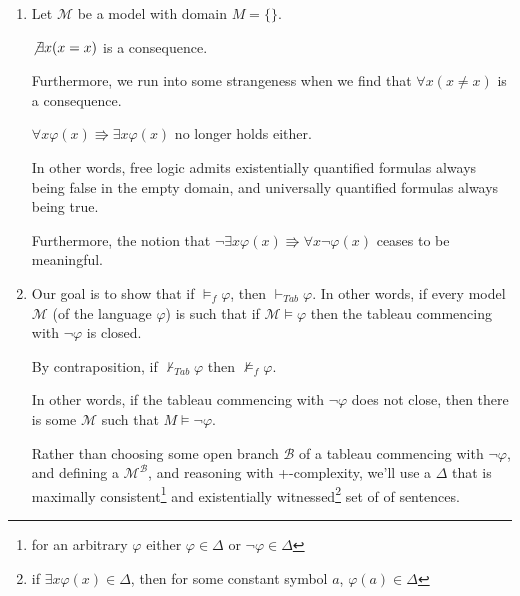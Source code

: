 \documentclass[a4paper]{article}
\newcommand{\MODEL}{\mathcal{M}}
\newcommand{\SET}[1]{\{ {#1} \}}
\begin{document}
\begin{enumerate}
    \item 

Let $\MODEL$ be a model with domain $M = \SET{}$. 


    $\not\exists x(x = x)$ is a consequence.

    Furthermore, we run into some strangeness when we find that $\forall x (x \neq x)$ is a consequence.

    $\forall x \varphi(x) \Rrightarrow \exists x \varphi(x)$ no longer holds either.

    In other words, free logic admits existentially quantified formulas always being false in the empty domain, and universally quantified formulas always being true.
    
    Furthermore, the notion that $\neg \exists x \varphi(x) \Rrightarrow \forall x \neg \varphi (x)$ ceases to be meaningful.


    \item  

Our goal is to show that if $\models_{f} \varphi$, then $\vdash_{Tab} \varphi$. In other words, if every model $\MODEL$ (of the language $\varphi$) is such that if $\MODEL \models \varphi$ then the tableau commencing with $\neg \varphi$ is closed.



By contraposition, if $\not\vdash_{Tab} \varphi$ then $ \not\models_{f} \varphi$.

In other words, if the tableau commencing with $\neg \varphi$ does not close, then there is some $\MODEL$ such that $M \models \neg \varphi$.


Rather than choosing some open branch $\mathcal{B}$ of a tableau commencing with $\neg \varphi$, and defining a $\MODEL^{\mathcal{B}}$, and reasoning with +-complexity, we'll use a $\Delta$ that is maximally consistent\footnote{for an arbitrary $\varphi$ either $\varphi \in \Delta$ or $\neg \varphi \in \Delta$} and existentially witnessed\footnote{if $\exists x \varphi(x) \in \Delta$, then for some constant symbol $a$, $\varphi(a) \in \Delta$} set of of sentences. 


\end{enumerate}
\end{document}
